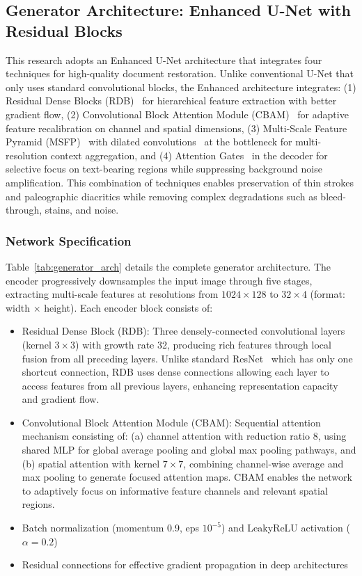 \documentclass[journal]{IEEEtran}
\begin{document}
\subsection{Generator Architecture: Enhanced U-Net with Residual Blocks}

This research adopts an Enhanced U-Net architecture that integrates four techniques for high-quality document restoration. Unlike conventional U-Net that only uses standard convolutional blocks, the Enhanced architecture integrates: (1) Residual Dense Blocks (RDB)~\cite{zhang2018residual} for hierarchical feature extraction with better gradient flow, (2) Convolutional Block Attention Module (CBAM)~\cite{woo2018cbam} for adaptive feature recalibration on channel and spatial dimensions, (3) Multi-Scale Feature Pyramid (MSFP)~\cite{lin2017fpn} with dilated convolutions~\cite{chen2017deeplab} at the bottleneck for multi-resolution context aggregation, and (4) Attention Gates~\cite{oktay2018attention} in the decoder for selective focus on text-bearing regions while suppressing background noise amplification. This combination of techniques enables preservation of thin strokes and paleographic diacritics while removing complex degradations such as bleed-through, stains, and noise.

\subsubsection{Network Specification}

Table~\ref{tab:generator_arch} details the complete generator architecture. The encoder progressively downsamples the input image through five stages, extracting multi-scale features at resolutions from $1024 \times 128$ to $32 \times 4$ (format: width $\times$ height). Each encoder block consists of:

\begin{itemize}
    \item Residual Dense Block (RDB): Three densely-connected convolutional layers (kernel $3 \times 3$) with growth rate 32, producing rich features through local fusion from all preceding layers. Unlike standard ResNet~\cite{he2016deep} which has only one shortcut connection, RDB uses dense connections allowing each layer to access features from all previous layers, enhancing representation capacity and gradient flow.
    \item Convolutional Block Attention Module (CBAM): Sequential attention mechanism consisting of: (a) channel attention with reduction ratio 8, using shared MLP for global average pooling and global max pooling pathways, and (b) spatial attention with kernel $7 \times 7$, combining channel-wise average and max pooling to generate focused attention maps. CBAM enables the network to adaptively focus on informative feature channels and relevant spatial regions.
    \item Batch normalization (momentum 0.9, eps $10^{-5}$) and LeakyReLU activation ($\alpha=0.2$)
    \item Residual connections for effective gradient propagation in deep architectures
\end{itemize}
\end{document}

